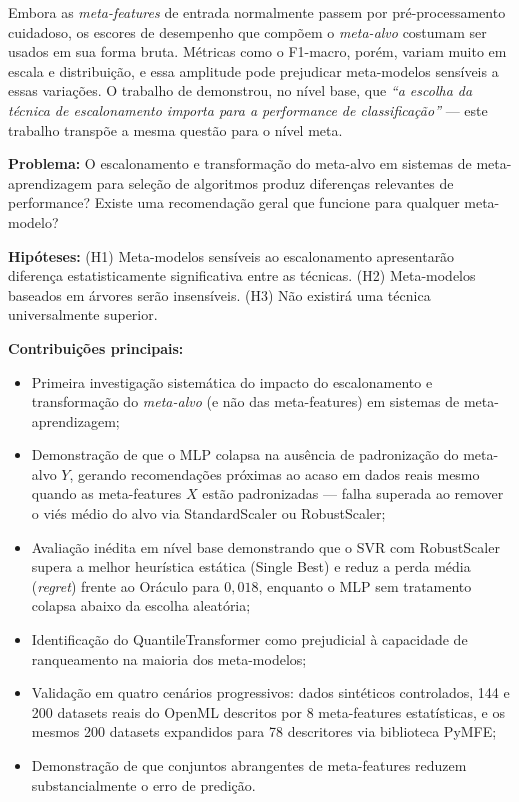 \documentclass[12pt]{article}
\begin{document}
Embora as \textit{meta-features} de entrada normalmente passem por pré-processamento cuidadoso, os escores de desempenho que compõem o \textit{meta-alvo} costumam ser usados em sua forma bruta. Métricas como o F1-macro, porém, variam muito em escala e distribuição, e essa amplitude pode prejudicar meta-modelos sensíveis a essas variações. O trabalho de \cite{amorim2022choice} demonstrou, no nível base, que \textit{``a escolha da técnica de escalonamento importa para a performance de classificação''} --- este trabalho transpõe a mesma questão para o nível meta.

\textbf{Problema:} O escalonamento e transformação do meta-alvo em sistemas de meta-aprendizagem para seleção de algoritmos produz diferenças relevantes de performance? Existe uma recomendação geral que funcione para qualquer meta-modelo?

\textbf{Hipóteses:} (H1) Meta-modelos sensíveis ao escalonamento apresentarão diferença estatisticamente significativa entre as técnicas. (H2) Meta-modelos baseados em árvores serão insensíveis. (H3) Não existirá uma técnica universalmente superior.

\textbf{Contribuições principais:}
\begin{itemize}
  \item Primeira investigação sistemática do impacto do escalonamento e transformação do \textit{meta-alvo} (e não das meta-features) em sistemas de meta-aprendizagem;
  \item Demonstração de que o MLP colapsa na ausência de padronização do meta-alvo $Y$, gerando recomendações próximas ao acaso em dados reais mesmo quando as meta-features $X$ estão padronizadas --- falha superada ao remover o viés médio do alvo via StandardScaler ou RobustScaler;
  \item Avaliação inédita em nível base demonstrando que o SVR com RobustScaler supera a melhor heurística estática (Single Best) e reduz a perda média (\textit{regret}) frente ao Oráculo para $0{,}018$, enquanto o MLP sem tratamento colapsa abaixo da escolha aleatória;
  \item Identificação do QuantileTransformer como prejudicial à capacidade de ranqueamento na maioria dos meta-modelos;
  \item Validação em quatro cenários progressivos: dados sintéticos controlados, 144 e 200 datasets reais do OpenML descritos por 8 meta-features estatísticas, e os mesmos 200 datasets expandidos para 78 descritores via biblioteca PyMFE;
  \item Demonstração de que conjuntos abrangentes de meta-features reduzem substancialmente o erro de predição.
\end{itemize}
\end{document}
